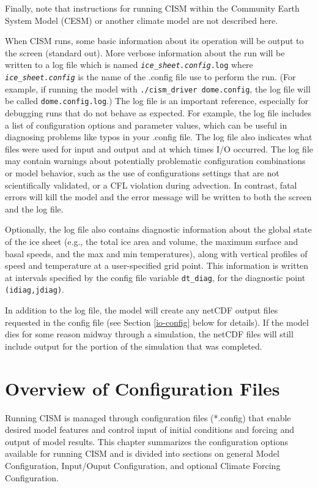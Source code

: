 Finally, note that instructions for running CISM within the Community Earth System Model (CESM)
or another climate model are not described here.

When CISM runs, some basic information about its operation will be output to 
the screen (standard out).  More verbose information about the run will be written 
to a log file which is named \texttt{\textit{ice\_sheet.config}.log} where 
\texttt{\textit{ice\_sheet.config}} is the name of the .config file use to perform
the run.  (For example, if running the model with  \texttt{./cism\_driver dome.config},
the log file will be called  \texttt{dome.config.log}.)  The log file is an
important reference, especially for debugging runs that do not behave as expected.
For example, the log file includes a list of configuration options and parameter
values, which can be useful in diagnosing problems like typos in your .config file.
The log file also indicates what files were used for input and output and at which
times I/O occurred.  The log file may contain warnings about potentially
problematic configuration combinations or model behavior, such as the use of
configurations settings that are not scientifically validated, or a CFL violation
during advection.  In contrast, fatal errors will kill the model and the error
message will be written to both the screen and the log file.

Optionally, the log file also contains diagnostic information about the global
state of the ice sheet (e.g., the total ice area and volume, the maximum surface and basal
speeds, and the max and min temperatures), along with vertical profiles of speed
and temperature at a user-specified grid point.  This information is written at intervals
specified by the config file variable \texttt{dt\_diag}, for the diagnostic
point \texttt{(idiag,jdiag)}.

In addition to the log file, the model will create any netCDF output files requested
in the config file (see Section \ref{io-config} below for details).  
If the model dies for some reason midway through a simulation,
the netCDF files will still include output for the portion of the simulation that 
was completed.

\section{Overview of Configuration Files}

Running CISM is managed through configuration files (*.config) that enable 
desired model features and control input of initial conditions and forcing 
and output of model results.  This chapter summarizes the configuration options 
available for running CISM and is divided into sections on general Model Configuration, 
Input/Ouput Configuration, and optional Climate Forcing Configuration.

